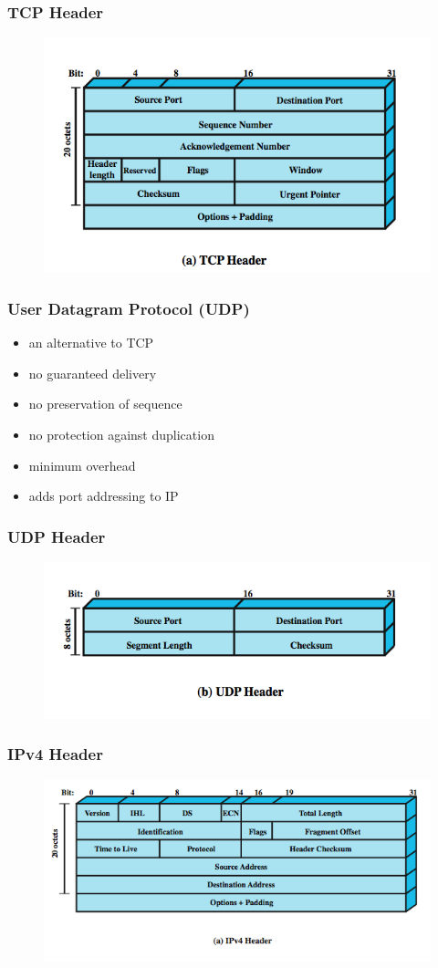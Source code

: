 \documentclass[pdflatex,compress]{beamer}
\begin{document}
\begin{frame}
	\frametitle{TCP Header}
	\begin{figure}
		\centering
		\includegraphics[width=0.8\linewidth]{img/img04}
	\end{figure}
\end{frame}

\begin{frame}
	\frametitle{User Datagram Protocol (UDP)}
	\begin{itemize}
		\item an alternative to TCP
		\item no guaranteed delivery
		\item no preservation of sequence
		\item no protection against duplication
		\item minimum overhead
		\item adds port addressing to IP
	\end{itemize}
\end{frame}

\begin{frame}
	\frametitle{UDP Header}
	\begin{figure}
		\centering
		\includegraphics[width=0.8\linewidth]{img/img05}
	\end{figure}
\end{frame}

\begin{frame}
	\frametitle{IPv4 Header}
	\begin{figure}
		\centering
		\includegraphics[width=0.8\linewidth]{img/img06}
	\end{figure}
\end{frame}
\end{document}
